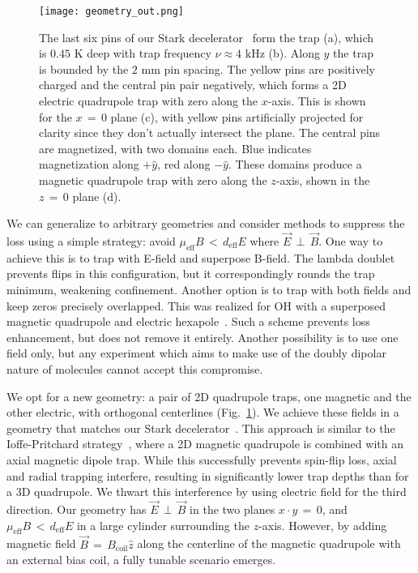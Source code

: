 \documentclass[%
 reprint,
 amsmath,amssymb,
 aps,
prl,
]{revtex4-1}
\newcommand{\epb}{{$\vec{E}\,{\perp}\,\vec{B}$}}
\begin{document}
\begin{figure}[tb]
\texttt{[image: geometry\_out.png]}%
\caption{
The last six pins of our Stark decelerator~\cite{Sawyer2008} form the trap (a), which is $0.45\text{ K}$ deep with trap frequency $\nu\approx4\text{ kHz}$ (b). 
Along $y$ the trap is bounded by the $2\text{ mm}$ pin spacing. 
The yellow pins are positively charged and the central pin pair negatively, which forms a 2D electric quadrupole trap with zero along the $x$-axis. 
This is shown for the $x\,{=}\,0$ plane (c), with yellow pins artificially projected for clarity since they don't actually intersect the plane. 
The central pins are magnetized, with two domains each. 
Blue indicates magnetization along $+\hat{y}$, red along $-\hat{y}$. 
These domains produce a magnetic quadrupole trap with zero along the $z$-axis, shown in the $z\,{=}\,0$ plane (d). 
\label{fig:CAD}}
\end{figure}

We can generalize to arbitrary geometries and consider methods to suppress the loss using a simple strategy: avoid $\mu_\text{eff}B \,{<}\, d_\text{eff}E$ where \epb. 
One way to achieve this is to trap with E-field and superpose B-field. 
The lambda doublet prevents flips in this configuration, but it correspondingly rounds the trap minimum, weakening confinement. 
Another option is to trap with both fields and keep zeros precisely overlapped. 
This was realized for OH with a superposed magnetic quadrupole and electric hexapole~\cite{Sawyer2007}. 
Such a scheme prevents loss enhancement, but does not remove it entirely. 
Another possibility is to use one field only, but any experiment which aims to make use of the doubly dipolar nature of molecules cannot accept this compromise. 

We opt for a new geometry: a pair of 2D quadrupole traps, one magnetic and the other electric, with orthogonal centerlines (Fig.~\ref{fig:CAD}). 
We achieve these fields in a geometry that matches our Stark decelerator~\cite{Bochinski2003}. 
This approach is similar to the Ioffe-Pritchard strategy~\cite{pritchard1983}, where a 2D magnetic quadrupole is combined with an axial magnetic dipole trap. 
While this successfully prevents spin-flip loss, axial and radial trapping interfere, resulting in significantly lower trap depths than for a 3D quadrupole. 
We thwart this interference by using electric field for the third direction. 
Our geometry has \epb{} in the two planes $x\cdot y\,{=}\,0$, and $\mu_\text{eff}B \,{<}\, d_\text{eff}E$ in a large cylinder surrounding the $z$-axis. 
However, by adding magnetic field $\vec{B}\,{=}\,B_\text{coil}\hat{z}$ along the centerline of the magnetic quadrupole with an external bias coil, a fully tunable scenario emerges. 
\end{document}

